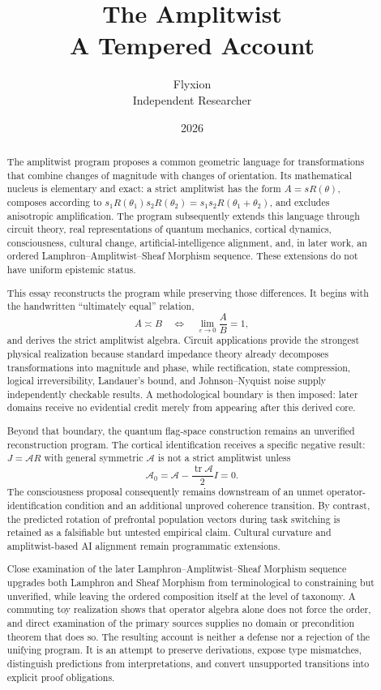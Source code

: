 \documentclass[11pt]{article}
\title{
  \textbf{The Amplitwist}\\[0.35em]
  \large A Tempered Account
}
\author{
  Flyxion\\
  \small Independent Researcher
}
\date{2026}
\newcommand{\ulteq}{\mathrel{\text{≍}}}
\begin{document}
\maketitle

\begin{abstract}

The amplitwist program proposes a common geometric language for transformations that combine changes of magnitude with changes of orientation. Its mathematical nucleus is elementary and exact: a strict amplitwist has the form $A=sR(\theta)$, composes according to $s_1R(\theta_1)s_2R(\theta_2)=s_1s_2R(\theta_1+\theta_2)$, and excludes anisotropic amplification. The program subsequently extends this language through circuit theory, real representations of quantum mechanics, cortical dynamics, consciousness, cultural change, artificial-intelligence alignment, and, in later work, an ordered Lamphron--Amplitwist--Sheaf Morphism sequence. These extensions do not have uniform epistemic status.

This essay reconstructs the program while preserving those differences. It begins with the handwritten ``ultimately equal'' relation,
\[
A\ulteq B
\quad\Longleftrightarrow\quad
\lim_{\varepsilon\to0}\frac{A}{B}=1,
\]
and derives the strict amplitwist algebra. Circuit applications provide the strongest physical realization because standard impedance theory already decomposes transformations into magnitude and phase, while rectification, state compression, logical irreversibility, Landauer's bound, and Johnson--Nyquist noise supply independently checkable results. A methodological boundary is then imposed: later domains receive no evidential credit merely from appearing after this derived core.

Beyond that boundary, the quantum flag-space construction remains an unverified reconstruction program. The cortical identification receives a specific negative result: $J=\mathcal AR$ with general symmetric $\mathcal A$ is not a strict amplitwist unless
\[
\mathcal A_0
=
\mathcal A-\frac{\operatorname{tr}\mathcal A}{2}I
=
0.
\]
The consciousness proposal consequently remains downstream of an unmet operator-identification condition and an additional unproved coherence transition. By contrast, the predicted rotation of prefrontal population vectors during task switching is retained as a falsifiable but untested empirical claim. Cultural curvature and amplitwist-based AI alignment remain programmatic extensions.

Close examination of the later Lamphron--Amplitwist--Sheaf Morphism sequence upgrades both Lamphron and Sheaf Morphism from terminological to constraining but unverified, while leaving the ordered composition itself at the level of taxonomy. A commuting toy realization shows that operator algebra alone does not force the order, and direct examination of the primary sources supplies no domain or precondition theorem that does so. The resulting account is neither a defense nor a rejection of the unifying program. It is an attempt to preserve derivations, expose type mismatches, distinguish predictions from interpretations, and convert unsupported transitions into explicit proof obligations.

\end{abstract}
\end{document}

